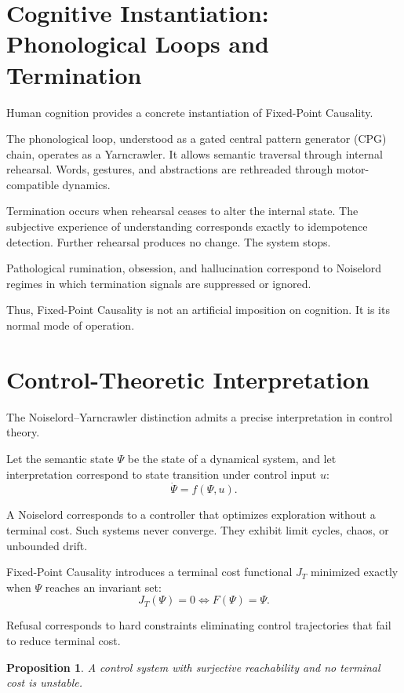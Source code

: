 \documentclass[12pt]{article}
\newtheorem{proposition}[theorem]{Proposition}
\theoremstyle{remark}
\begin{document}
\section{Cognitive Instantiation: Phonological Loops and Termination}

Human cognition provides a concrete instantiation of Fixed-Point Causality.

The phonological loop, understood as a gated central pattern generator (CPG) chain, operates as a Yarncrawler. It allows semantic traversal through internal rehearsal. Words, gestures, and abstractions are rethreaded through motor-compatible dynamics.

Termination occurs when rehearsal ceases to alter the internal state. The subjective experience of understanding corresponds exactly to idempotence detection. Further rehearsal produces no change. The system stops.

Pathological rumination, obsession, and hallucination correspond to Noiselord regimes in which termination signals are suppressed or ignored.

Thus, Fixed-Point Causality is not an artificial imposition on cognition. It is its normal mode of operation.

\section{Control-Theoretic Interpretation}

The Noiselord--Yarncrawler distinction admits a precise interpretation in control theory.

Let the semantic state $\Psi$ be the state of a dynamical system, and let interpretation correspond to state transition under control input $u$:
\[
\dot{\Psi} = f(\Psi, u).
\]

A Noiselord corresponds to a controller that optimizes exploration without a terminal cost. Such systems never converge. They exhibit limit cycles, chaos, or unbounded drift.

Fixed-Point Causality introduces a terminal cost functional $J_T$ minimized exactly when $\Psi$ reaches an invariant set:
\[
J_T(\Psi) = 0 \iff F(\Psi) = \Psi.
\]

Refusal corresponds to hard constraints eliminating control trajectories that fail to reduce terminal cost.

\begin{proposition}
A control system with surjective reachability and no terminal cost is unstable.
\end{proposition}
\end{document}

